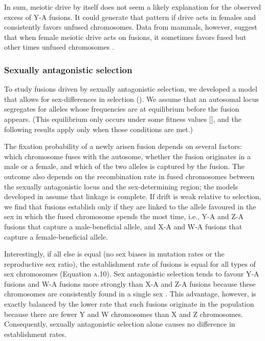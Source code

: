 In sum, meiotic drive by itself does not seem a likely explanation for the observed excess of Y-A fusions. It could generate that pattern if drive acts in females and consistently favors unfused chromosomes. Data from mammals, however, suggest that when female meiotic drive acts on fusions, it sometimes favors fused but other times unfused chromosomes \citep{Pardo2001a, Pardo2001b}.

\subsubsection{Sexually antagonistic selection} 

To study fusions driven by sexually antagonistic selection, we developed a model that allows for sex-differences in selection (). We assume that an autosomal locus segregates for alleles whose frequencies are at equilibrium before the fusion appears. (This equilibrium only occurs under some fitness values [\citealt{Clark1988}], and the following results apply only when those conditions are met.)

The fixation probability of a newly arisen fusion depends on several factors: which chromosome fuses with the autosome, whether the fusion originates in a male or a female, and which of the two alleles is captured by the fusion. The outcome also depends on the recombination rate in fused chromosomes between the sexually antagonistic locus and the sex-determining region; the models developed in  assume that linkage is complete. If drift is weak relative to selection, we find that fusions establish only if they are linked to the allele favoured in the sex in which the fused chromosome spends the most time, i.e., Y-A and Z-A fusions that capture a male-beneficial allele, and X-A and W-A fusions that capture a female-beneficial allele. 

Interestingly, if all else is equal (no sex biases in mutation rates or the reproductive sex ratio), the establishment rate of fusions is equal for all types of sex chromosomes (Equation \textsc{a.10}). Sex antagonistic selection tends to favour Y-A fusions and W-A fusions more strongly than X-A and Z-A fusions because these chromosomes are consistently found in a single sex \citep{Charlesworth1980}. This advantage, however, is exactly balanced by the lower rate that such fusions originate in the population because there are fewer Y and W chromosomes than X and Z chromosomes. Consequently, sexually antagonistic selection alone causes no difference in establishment rates.

